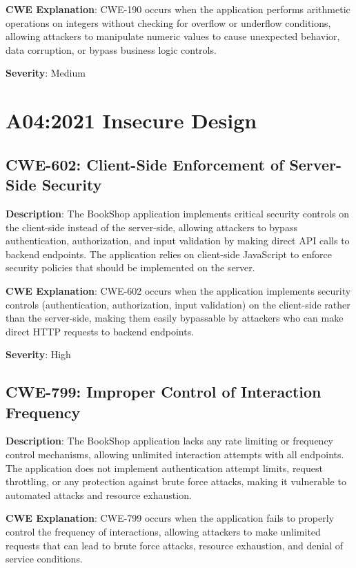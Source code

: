 \documentclass[]{UCD_CS_FYP_Report}
\begin{document}
\textbf{CWE Explanation}: CWE-190 occurs when the application performs arithmetic operations on integers without checking for overflow or underflow conditions, allowing attackers to manipulate numeric values to cause unexpected behavior, data corruption, or bypass business logic controls.

\textbf{Severity}: Medium



\chapter{A04:2021 Insecure Design}

\section{CWE-602: Client-Side Enforcement of Server-Side Security}

\textbf{Description}: The BookShop application implements critical security controls on the client-side instead of the server-side, allowing attackers to bypass authentication, authorization, and input validation by making direct API calls to backend endpoints. The application relies on client-side JavaScript to enforce security policies that should be implemented on the server.

\textbf{CWE Explanation}: CWE-602 occurs when the application implements security controls (authentication, authorization, input validation) on the client-side rather than the server-side, making them easily bypassable by attackers who can make direct HTTP requests to backend endpoints.

\textbf{Severity}: High



\section{CWE-799: Improper Control of Interaction Frequency}

\textbf{Description}: The BookShop application lacks any rate limiting or frequency control mechanisms, allowing unlimited interaction attempts with all endpoints. The application does not implement authentication attempt limits, request throttling, or any protection against brute force attacks, making it vulnerable to automated attacks and resource exhaustion.

\textbf{CWE Explanation}: CWE-799 occurs when the application fails to properly control the frequency of interactions, allowing attackers to make unlimited requests that can lead to brute force attacks, resource exhaustion, and denial of service conditions.
\end{document}

